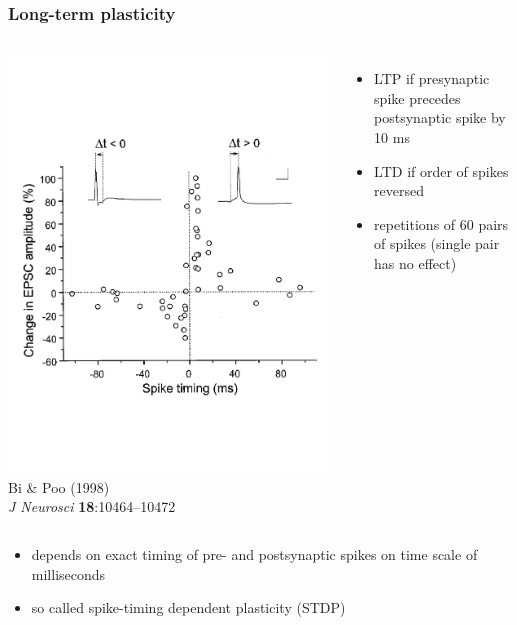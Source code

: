 \documentclass{beamer}
\begin{document}
\begin{frame}
  \frametitle{Long-term plasticity}

\begin{columns}
\includegraphics[width=\textwidth]{./figures/bi_stdp}
\vspace*{3mm}
\tiny{Bi \&  Poo (1998)\\
\textit{J Neurosci} \textbf{18}:10464--10472}
\begin{itemize}
  \item LTP if presynaptic spike precedes postsynaptic spike by 10 ms
  \item LTD if order of spikes reversed
  \item repetitions of 60 pairs of spikes (single pair has no effect)
\end{itemize}

\end{columns}

\vspace*{3mm}

\small
{
\begin{itemize}
\item depends on exact timing of pre- and postsynaptic spikes on time scale of milliseconds
\item so called spike-timing dependent plasticity (STDP)
\end{itemize}
}

\end{frame}
\end{document}
